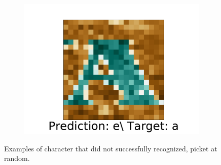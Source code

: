 \documentclass[../main.tex]{subfiles}
\begin{document}
\begin{figure}
\begin{subfigure}[t]{0.15\textwidth}
        \includegraphics[width=\textwidth]{figures/ex/n_4.pdf}
        \label{fig:gull}
    \end{subfigure}
    \caption{Examples of character that \knn did not successfully recognized, picket at random.}\label{fig:p_knn}
\end{figure}
\end{document}
